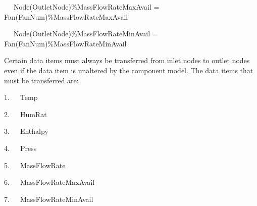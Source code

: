 ~~ Node(OutletNode)\%MassFlowRateMaxAvail = Fan(FanNum)\%MassFlowRateMaxAvail

~~ Node(OutletNode)\%MassFlowRateMinAvail = Fan(FanNum)\%MassFlowRateMinAvail

Certain data items must always be transferred from inlet nodes to outlet nodes even if the data item is unaltered by the component model. The data items that must be transferred are:

1.~~~Temp

2.~~~HumRat

3.~~~Enthalpy

4.~~~Press

5.~~~MassFlowRate

6.~~~MassFlowRateMaxAvail

7.~~~MassFlowRateMinAvail
